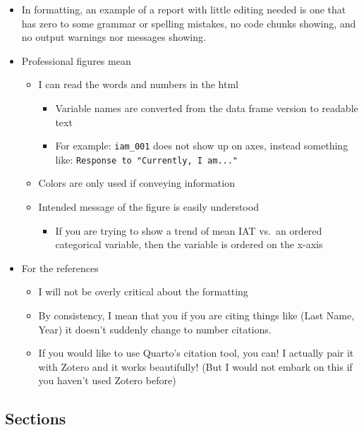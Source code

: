 \documentclass[
  letterpaper,
  DIV=11,
  numbers=noendperiod]{scrartcl}
\providecommand{\tightlist}{%
  \setlength{\itemsep}{0pt}\setlength{\parskip}{0pt}}\usepackage{longtable,booktabs,array}
\begin{document}
\begin{itemize}
\item
  In formatting, an example of a report with little editing needed is
  one that has zero to some grammar or spelling mistakes, no code chunks
  showing, and no output warnings nor messages showing.
\item
  Professional figures mean

  \begin{itemize}
  \item
    I can read the words and numbers in the html

    \begin{itemize}
    \item
      Variable names are converted from the data frame version to
      readable text
    \item
      For example: \texttt{iam\_001} does not show up on axes, instead
      something like: \texttt{Response\ to\ "Currently,\ I\ am..."}
    \end{itemize}
  \item
    Colors are only used if conveying information
  \item
    Intended message of the figure is easily understood

    \begin{itemize}
    \tightlist
    \item
      If you are trying to show a trend of mean IAT vs.~an ordered
      categorical variable, then the variable is ordered on the x-axis
    \end{itemize}
  \end{itemize}
\item
  For the references

  \begin{itemize}
  \item
    I will not be overly critical about the formatting
  \item
    By consistency, I mean that you if you are citing things like (Last
    Name, Year) it doesn't suddenly change to number citations.
  \item
    If you would like to use Quarto's citation tool, you can! I actually
    pair it with Zotero and it works beautifully! (But I would not
    embark on this if you haven't used Zotero before)
  \end{itemize}
\end{itemize}

\subsection{Sections}\label{sections}
\end{document}
